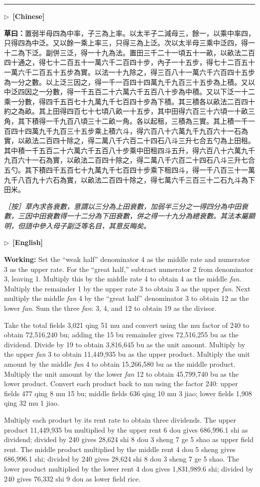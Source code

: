 \documentclass[10pt,a4paper]{article}
\newcommand{\longline}{\par\noindent\rule{\textwidth}{0.4pt}\par}
\newcommand{\CNmarker}{\noindent\textcolor{cnlabel}{$\triangleright$\ \textbf{[Chinese]}}\par}
\newcommand{\ENmarker}{\noindent\textcolor{enlabel}{$\triangleright$\ \textbf{[English]}}\par}
\newcommand{\Working}[1]{\par\noindent\textbf{\color{workingcolor}草曰：}#1\par}
\newcommand{\EditorialNote}[1]{\par\noindent\textit{［按］#1}\par}
\newcommand{\WorkingEn}[1]{\par\noindent\textbf{\color{workingcolor}Working:} #1\par}
\begin{document}
\longline

\CNmarker
\Working{置弱半母四為中率，子三為上率。以太半子二減母三，餘一，以乘中率四，只得四為中泛。又以餘一乘上率三，只得三為上泛。次以太半母三乘中泛四，得一十二為下泛。副併三泛，得一十九為法。置田三千二十一頃五十一畝，以畝法二百四十通之，得七十二百五十一萬六千二百四十步，內子一十五步，得七十二百五十一萬六千二百五十五步為實。以法一十九除之，得三百八十一萬六千六百四十五步為一分之數。以上泛三因之，得一千一百四十四萬九千九百三十五步為上積。又以中泛四因之一分數，得一千五百二十六萬六千五百八十步為中積。又以下泛一十二乘一分數，得四千五百七十九萬九千七百四十步為下積。其三積各以畝法二百四十約之為畝。其上田得四百七十七頃八畝一十五步，其中田得六百三十六頃一十畝三角，其下積得一千九百八頃三十二畝一角。各以起租，三積為三實。其上積一千一百四十四萬九千九百三十五步乘上積六斗，得六百八十六萬九千九百六十一石為實，以畝法二百四十除之，得二萬八千六百二十四石八斗三升七合五勺為上田租。其中積一千五百二十六萬六千五百八十步乘中田租四斗五升，得六百八十六萬九千九百六十一石為實，以畝法二百四十除之，得二萬八千六百二十四石八斗三升七合五勺。其下積四千五百七十九萬九千七百四十步乘下租四斗，得一千八百三十一萬九千八百九十六石為實，以畝法二百四十除之，得七萬六千三百三十二石九斗為下田米。}

\EditorialNote{草內求各衰數，意謂以三分為上田衰數，加弱半三分之一得四分為中田衰數，三因中田衰數得一十二分為下田衰數，併之得一十九分為總衰數。其法本屬顯明，但語中參入母子副泛等名目，其意反晦矣。}

\ENmarker
\WorkingEn{Set the ``weak half'' denominator 4 as the middle rate and numerator 3 as the upper rate. For the ``great half,'' subtract numerator 2 from denominator 3, leaving 1. Multiply this by the middle rate 4 to obtain 4 as the middle \textit{fan}. Multiply the remainder 1 by the upper rate 3 to obtain 3 as the upper \textit{fan}. Next multiply the middle \textit{fan} 4 by the ``great half'' denominator 3 to obtain 12 as the lower \textit{fan}. Sum the three \textit{fan}: 3, 4, and 12 to obtain 19 as the divisor.

Take the total fields 3,021 qing 51 mu and convert using the mu factor of 240 to obtain 72,516,240 bu; adding the 15 bu remainder gives 72,516,255 bu as the dividend. Divide by 19 to obtain 3,816,645 bu as the unit amount. Multiply by the upper \textit{fan} 3 to obtain 11,449,935 bu as the upper product. Multiply the unit amount by the middle \textit{fan} 4 to obtain 15,266,580 bu as the middle product. Multiply the unit amount by the lower \textit{fan} 12 to obtain 45,799,740 bu as the lower product. Convert each product back to mu using the factor 240: upper fields 477 qing 8 mu 15 bu; middle fields 636 qing 10 mu 3 jiao; lower fields 1,908 qing 32 mu 1 jiao.

Multiply each product by its rent rate to obtain three dividends. The upper product 11,449,935 bu multiplied by the upper rent 6 dou gives 686,996.1 shi as dividend; divided by 240 gives 28,624 shi 8 dou 3 sheng 7 ge 5 shao as upper field rent. The middle product multiplied by the middle rent 4 dou 5 sheng gives 686,996.1 shi; divided by 240 gives 28,624 shi 8 dou 3 sheng 7 ge 5 shao. The lower product multiplied by the lower rent 4 dou gives 1,831,989.6 shi; divided by 240 gives 76,332 shi 9 dou as lower field rice.}
\end{document}
